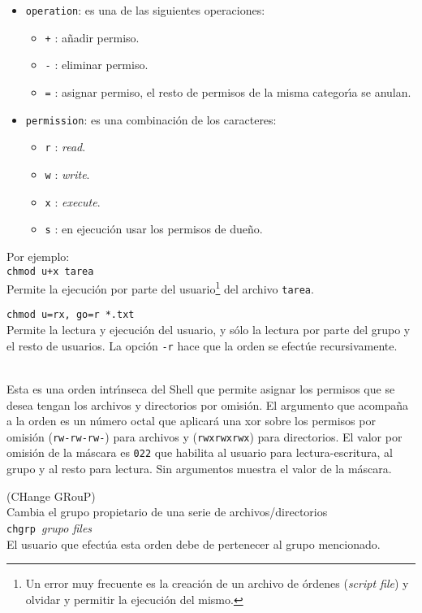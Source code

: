 \begin{itemize}
\begin{itemize}
\item {\verb+operation+}: es una de las siguientes operaciones:
\begin{itemize}
\item \verb=+= : a{\~n}adir permiso.
\item \verb+-+ : eliminar permiso. 
\item \verb+=+ : asignar permiso, el resto de permisos de la misma categor{\'\i}a
  se anulan.
\end{itemize}
\item {\verb+permission+}: es una combinaci{\'o}n de los caracteres:
\begin{itemize}
\item {\verb+r+} : {\it read}.
\item {\verb+w+} : {\it write}.
\item {\verb+x+} : {\it execute}.
\item {\verb+s+} : en ejecuci{\'o}n usar los permisos de due{\~n}o.
\end{itemize}
\end{itemize}
Por ejemplo:\\
{\verb=chmod u+x tarea=}\\
Permite la ejecuci{\'o}n por parte del usuario\footnote{Un error muy
  frecuente es la creaci{\'o}n de un archivo de {\'o}rdenes ({\it script
    file}) y olvidar y permitir la ejecuci{\'o}n del mismo.} del archivo
{\verb+tarea+}.
 
{\verb+chmod u=rx, go=r *.txt+}\\
Permite la lectura y ejecuci{\'o}n del usuario, y s{\'o}lo la lectura por
parte del grupo y el resto de usuarios. La opci{\'o}n {\verb=-r=} hace que
la orden se efect{\'u}e recursivamente.

\end{itemize}

\noindent
{}\\
Esta es una orden intr{\'\i}nseca del Shell que permite asignar los
permisos que se desea tengan los archivos y directorios por omisi{\'o}n.
El argumento que acompa{\~n}a a la orden es un n{\'u}mero octal que aplicar{\'a}
una {\sc xor} sobre los permisos por omisi{\'o}n ({\verb+rw-rw-rw-+}) para
archivos y ({\verb+rwxrwxrwx+}) para directorios. El valor por omisi{\'o}n
de la m{\'a}scara es {\verb+022+} que habilita al usuario para
lectura-escritura, al grupo y al resto para lectura. Sin argumentos
muestra el valor de la m{\'a}scara.

\noindent
{} (CHange GRouP)\\
Cambia el grupo propietario de una serie de archivos/directorios\\
{\verb+chgrp +}{\it grupo files}\\
El usuario que efect{\'u}a esta orden debe de pertenecer al grupo
mencionado.

